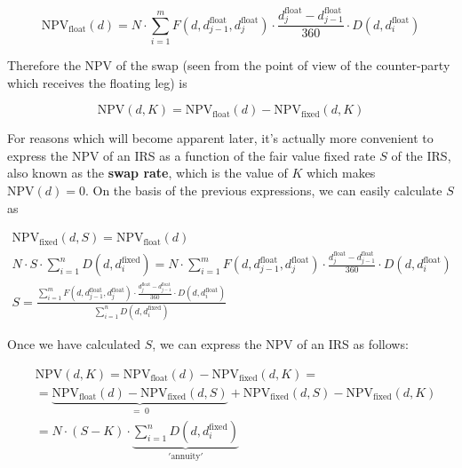 \begin{equation}\mathrm{NPV}_{\mathrm{float}}(d) = N\cdot\sum_{i=1}^{m}F(d, d_{j-1}^{\mathrm{float}}, d_{j}^{\mathrm{float}}) \cdot \frac{d_{j}^{\mathrm{float}}-d_{j-1}^{\mathrm{float}}}{360}
\cdot D(d, d_{i}^{\mathrm{float}})\end{equation}

Therefore the NPV of the swap (seen from the point of view of the counter-party which receives the floating leg) is

\begin{equation}\mathrm{NPV}(d, K) = \mathrm{NPV}_{\mathrm{float}}(d) - \mathrm{NPV}_{\mathrm{fixed}}(d, K)\end{equation}

For reasons which will become apparent later, it's actually more convenient to express the NPV of an IRS as a function of the fair value fixed rate $S$ of the IRS, also known as the \textbf{swap rate}, which is the value of $K$ which makes \(\mathrm{NPV}(d)=0\). On the basis of the previous expressions, we can easily calculate $S$ as

\begin{equation}
\begin{gathered}
\mathrm{NPV}_{\mathrm{fixed}}(d, S) = \mathrm{NPV}_{\mathrm{float}}(d)\\
N\cdot S\cdot\sum_{i=1}^{n}D(d, d_{i}^{\mathrm{fixed}}) = N\cdot\sum_{i=1}^{m}F(d, d_{j-1}^{\mathrm{float}}, d_{j}^{\mathrm{float}}) \cdot \frac{d_{j}^{\mathrm{float}}-d_{j-1}^{\mathrm{float}}}{360} \cdot D(d, d_{i}^{\mathrm{float}})\\
S=\frac{\sum_{i=1}^{m}F(d, d_{j-1}^{\mathrm{float}}, d_{j}^{\mathrm{float}}) \cdot \frac{d_{j}^{\mathrm{float}}-d_{j-1}^{\mathrm{float}}}{360}
\cdot D(d, d_{i}^{\mathrm{float}})}{\sum_{i=1}^{n}D(d, d_i^{\mathrm{fixed}})}
\end{gathered}
\end{equation}

Once we have calculated \(S\), we can express the \(\mathrm{NPV}\) of an IRS as follows:

\begin{equation}
\begin{split}&\mathrm{NPV}(d, K) = \mathrm{NPV}_{\mathrm{float}}(d) - \mathrm{NPV}_{\mathrm{fixed}}(d, K) = \\ 
&= \underbrace{\mathrm{NPV}_{\mathrm{float}}(d) - \mathrm{NPV}_{\mathrm{fixed}}(d, S)}_{\mathrm{=\;0}} + \mathrm{NPV}_{\mathrm{fixed}}(d, S) - \mathrm{NPV}_{\mathrm{fixed}}(d, K) \\ 
& = N\cdot(S-K)\cdot\underbrace{\sum_{i=1}^{n}D(d, d_{i}^{\mathrm{fixed}})}_{\mathrm{'annuity'}}
\end{split}
\end{equation}

